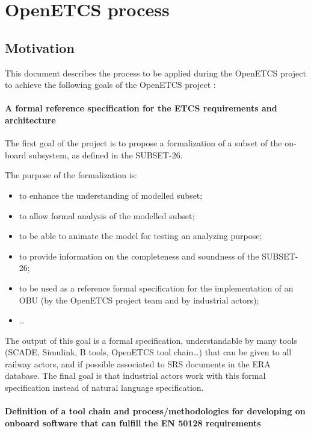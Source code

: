 
\section{OpenETCS process}
\subsection{Motivation}

This document describes the process to  be applied  during the OpenETCS project to achieve the following goals of the OpenETCS project :

\paragraph{A formal reference specification for the ETCS requirements and architecture}
The first goal of the project is to propose a formalization of a subset of the on-board subsystem,
as defined in the SUBSET-26. 

The purpose of the formalization is:
\begin{itemize}
\item to enhance the understanding of modelled subset;
\item to allow formal analysis of the modelled subset;
\item to be able to animate the model for testing an analyzing purpose;
\item to provide information on the completeness and soundness of the SUBSET-26;
\item to be used as a reference formal specification for the implementation of an OBU 
(by the OpenETCS project team and by industrial actors);
\item \dots
\end{itemize}


The output of this goal is a formal specification, understandable by many tools (SCADE, 
Simulink, B tools, OpenETCS tool chain…) that can be given to all railway actors, and 
if possible associated to SRS documents in the ERA database.
The final goal is that industrial actors work with this formal specification instead of 
natural language specification.


\paragraph{Definition of a tool chain and process/methodologies for developing 
on onboard software that can fulfill the EN 50128 requirements}


